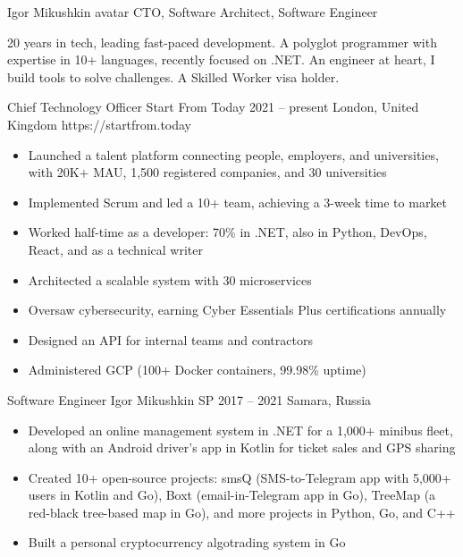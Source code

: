 \documentclass[9pt,a4paper]{juicv}
\begin{document}
\begin{paracol}{2}
\cvMakeHeader
    {Igor Mikushkin}
    {avatar}
    {CTO, Software Architect, Software Engineer}

    20 years in tech, leading fast-paced development.
    A polyglot programmer with expertise in 10+ languages, recently focused on .NET.
    An engineer at heart, I build tools to solve challenges.
    A Skilled Worker visa holder.

    \cvLeftEvent
        {Chief Technology Officer}
        {Start From Today}
        {2021 -- present}
        {London, United Kingdom}
        {https://startfrom.today}

        \begin{itemize}
            \item Launched a talent platform connecting people, employers, and universities,
                  with 20K+ MAU, 1,500 registered companies, and 30 universities
            \item Implemented Scrum and led a 10+ team,
                  achieving a 3-week time to market
            \item Worked half-time as a developer: 70\% in .NET,
                  also in Python, DevOps, React, and as a technical writer
            \item Architected a scalable system with 30 microservices
            \item Oversaw cybersecurity, earning Cyber Essentials Plus certifications annually
            \item Designed an API for internal teams and contractors
            \item Administered GCP (100+ Docker containers, 99.98\% uptime)
        \end{itemize}

    \cvLeftEvent
        {Software Engineer}
        {Igor Mikushkin SP}
        {2017 -- 2021}
        {Samara, Russia}
        {}

        \begin{itemize}
            \item Developed an online management system in .NET for a 1,000+ minibus fleet,
                  along with an Android driver’s app in Kotlin for ticket sales and GPS sharing
            \item Created 10+ open-source projects:
                  smsQ (SMS-to-Telegram app with 5,000+ users in Kotlin and Go),
                  Boxt (email-in-Telegram app in Go),
                  TreeMap (a red-black tree-based map in Go),
                  and more projects in Python, Go, and C++
            \item Built a personal cryptocurrency algotrading system in Go
        \end{itemize}


\end{paracol}
\end{document}
